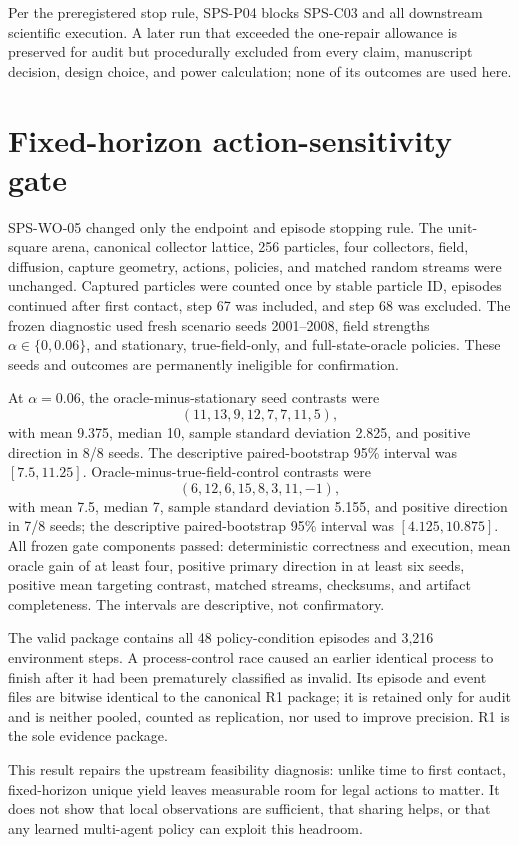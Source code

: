 \documentclass{article}
\begin{document}
Per the preregistered stop rule, SPS-P04 blocks SPS-C03 and all downstream
scientific execution. A later run that exceeded the one-repair allowance is
preserved for audit but procedurally excluded from every claim, manuscript
decision, design choice, and power calculation; none of its outcomes are used
here.

\section{Fixed-horizon action-sensitivity gate}

SPS-WO-05 changed only the endpoint and episode stopping rule. The unit-square
arena, canonical collector lattice, 256 particles, four collectors, field,
diffusion, capture geometry, actions, policies, and matched random streams were
unchanged. Captured particles were counted once by stable particle ID, episodes
continued after first contact, step 67 was included, and step 68 was excluded.
The frozen diagnostic used fresh scenario seeds 2001--2008, field strengths
\(\alpha\in\{0,0.06\}\), and stationary, true-field-only, and full-state-oracle
policies. These seeds and outcomes are permanently ineligible for confirmation.

At \(\alpha=0.06\), the oracle-minus-stationary seed contrasts were
\[
 (11,13,9,12,7,7,11,5),
\]
with mean 9.375, median 10, sample standard deviation 2.825, and positive
direction in 8/8 seeds. The descriptive paired-bootstrap 95\% interval was
\([7.5,11.25]\). Oracle-minus-true-field-control contrasts were
\[
 (6,12,6,15,8,3,11,-1),
\]
with mean 7.5, median 7, sample standard deviation 5.155, and positive direction
in 7/8 seeds; the descriptive paired-bootstrap 95\% interval was
\([4.125,10.875]\). All frozen gate components passed: deterministic
correctness and execution, mean oracle gain of at least four, positive primary
direction in at least six seeds, positive mean targeting contrast, matched
streams, checksums, and artifact completeness. The intervals are descriptive,
not confirmatory.

The valid package contains all 48 policy-condition episodes and 3,216
environment steps. A process-control race caused an earlier identical process
to finish after it had been prematurely classified as invalid. Its episode and
event files are bitwise identical to the canonical R1 package; it is retained
only for audit and is neither pooled, counted as replication, nor used to
improve precision. R1 is the sole evidence package.

This result repairs the upstream feasibility diagnosis: unlike time to first
contact, fixed-horizon unique yield leaves measurable room for legal actions to
matter. It does not show that local observations are sufficient, that sharing
helps, or that any learned multi-agent policy can exploit this headroom.
\end{document}
